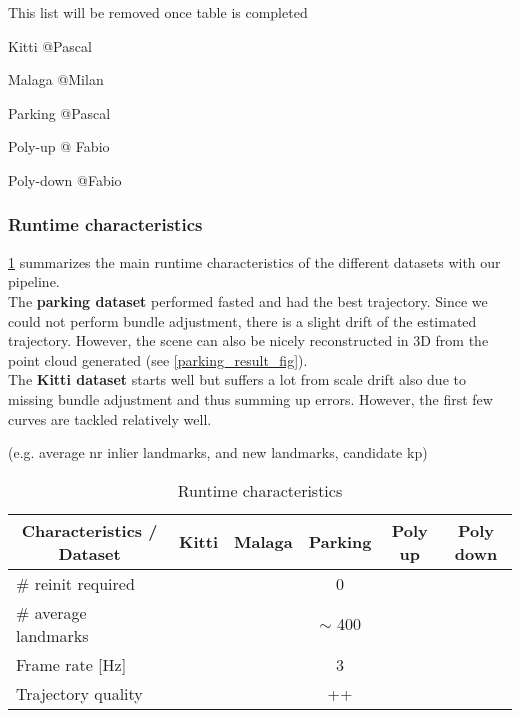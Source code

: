 This list will be removed once table is completed
\begin{compactitem}
	\item Kitti @Pascal
	\item Malaga @Milan
	\item Parking @Pascal
	\item Poly-up @ Fabio
	\item Poly-down @Fabio
\end{compactitem}
	
	
\subsubsection{Runtime characteristics}
\cref{runtime_table} summarizes the main runtime characteristics of the different datasets with our pipeline.\\

The \textbf{parking dataset} performed fasted and had the best trajectory. Since we could not perform bundle adjustment, there is a slight drift of the estimated trajectory. However, the scene can also be nicely reconstructed in 3D from the point cloud generated (see \cref{parking_result_fig}).\\

The \textbf{Kitti dataset} starts well but suffers a lot from scale drift also due to missing bundle adjustment and thus summing up errors. However, the first few curves are tackled relatively well.

(e.g. average nr inlier landmarks, and new landmarks, candidate kp)
\begin{table}[h!!]
	\centering
	\begin{tabular}{|l|c|c|c|c|c|}
	\hline
	\multicolumn{1}{|c|}{\textbf{Characteristics / Dataset}} & \textbf{Kitti} & \textbf{Malaga} & \textbf{Parking} & \textbf{Poly up} & \textbf{Poly down} \\ \hline
	\# reinit required                                       &                &                 & 0                &                  &                    \\ \hline
	\# average landmarks                                     &                &                 & $\sim$ 400       &                  &                    \\ \hline
	Frame rate {[}Hz{]}                                      &                &                 & 3                &                  &                    \\ \hline
	Trajectory quality                                       &                &                 & ++               &                  &                    \\ \hline
	\end{tabular}
	\caption{Runtime characteristics}
	\label{runtime_table}
\end{table}

